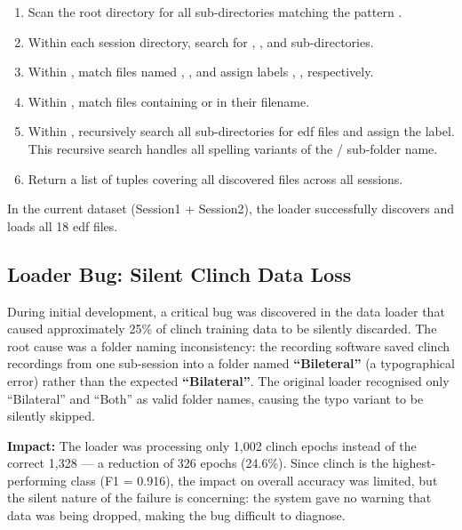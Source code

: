 \begin{enumerate}[leftmargin=*]
    \item Scan the  root directory for all
    sub-directories matching the pattern .
    \item Within each session directory, search for
    , , and 
    sub-directories.
    \item Within , match files named
    , , 
    and assign labels , ,
     respectively.
    \item Within , match files containing
     or  in their filename.
    \item Within , recursively search all
    sub-directories for \acrshort{edf} files and assign the
     label. This recursive search handles all
    spelling variants of the /
    sub-folder name.
    \item Return a list of  tuples
    covering all discovered files across all sessions.
\end{enumerate}

In the current dataset (Session1 + Session2), the loader
successfully discovers and loads all 18 \acrshort{edf} files.

\subsection{Loader Bug: Silent Clinch Data Loss}
\label{sec:dc_bug}

During initial development, a critical bug was discovered in
the data loader that caused approximately 25\% of clinch training
data to be silently discarded. The root cause was a folder naming
inconsistency: the recording software saved clinch recordings
from one sub-session into a folder named \textbf{``Bileteral''}
(a typographical error) rather than the expected
\textbf{``Bilateral''}. The original loader recognised only
``Bilateral'' and ``Both'' as valid folder names, causing the
typo variant to be silently skipped.

\textbf{Impact:} The loader was processing only 1{,}002 clinch
epochs instead of the correct 1{,}328 --- a reduction of 326
epochs (24.6\%). Since clinch is the highest-performing class
(F1 = 0.916), the impact on overall accuracy was limited, but
the silent nature of the failure is concerning: the system gave
no warning that data was being dropped, making the bug difficult
to diagnose.

